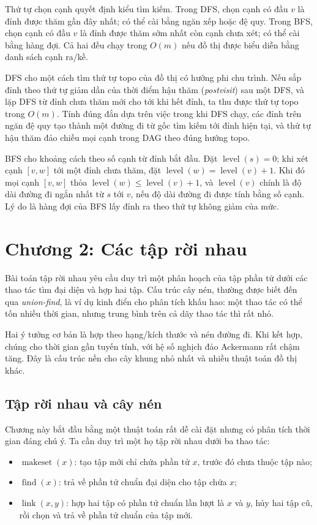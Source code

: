 \documentclass[11pt]{article}
\begin{document}
Thứ tự chọn cạnh quyết định kiểu tìm kiếm. Trong DFS, chọn cạnh có đầu \(v\)
là đỉnh được thăm gần đây nhất; có thể cài bằng ngăn xếp hoặc đệ quy. Trong
BFS, chọn cạnh có đầu \(v\) là đỉnh được thăm sớm nhất còn cạnh chưa xét; có thể
cài bằng hàng đợi. Cả hai đều chạy trong \(O(m)\) nếu đồ thị được biểu diễn bằng
danh sách cạnh ra/kề.

DFS cho một cách tìm thứ tự topo của đồ thị có hướng phi chu trình. Nếu sắp
đỉnh theo thứ tự giảm dần của thời điểm hậu thăm (\emph{postvisit}) sau một
DFS, và lặp DFS từ đỉnh chưa thăm mới cho tới khi hết đỉnh, ta thu được thứ tự
topo trong \(O(m)\). Tính đúng đắn dựa trên việc trong khi DFS chạy, các đỉnh
trên ngăn đệ quy tạo thành một đường đi từ gốc tìm kiếm tới đỉnh hiện tại, và
thứ tự hậu thăm đảo chiều mọi cạnh trong DAG theo đúng hướng topo.

BFS cho khoảng cách theo số cạnh từ đỉnh bắt đầu. Đặt
\(\operatorname{level}(s)=0\); khi xét cạnh \([v,w]\) tới một đỉnh chưa thăm,
đặt \(\operatorname{level}(w)=\operatorname{level}(v)+1\). Khi đó mọi cạnh
\([v,w]\) thỏa
\(\operatorname{level}(w)\le \operatorname{level}(v)+1\), và
\(\operatorname{level}(v)\) chính là độ dài đường đi ngắn nhất từ \(s\) tới
\(v\), nếu độ dài đường đi được tính bằng số cạnh. Lý do là hàng đợi của BFS lấy
đỉnh ra theo thứ tự không giảm của mức.

\section{Chương 2: Các tập rời nhau}

Bài toán tập rời nhau yêu cầu duy trì một phân hoạch của tập phần tử dưới các
thao tác tìm đại diện và hợp hai tập. Cấu trúc cây nén, thường được biết đến
qua \emph{union-find}, là ví dụ kinh điển cho phân tích khấu hao: một thao tác
có thể tốn nhiều thời gian, nhưng trung bình trên cả dãy thao tác thì rất nhỏ.

Hai ý tưởng cơ bản là hợp theo hạng/kích thước và nén đường đi. Khi kết hợp,
chúng cho thời gian gần tuyến tính, với hệ số nghịch đảo Ackermann rất chậm
tăng. Đây là cấu trúc nền cho cây khung nhỏ nhất và nhiều thuật toán đồ thị
khác.

\subsection*{Tập rời nhau và cây nén}

Chương này bắt đầu bằng một thuật toán rất dễ cài đặt nhưng có phân tích thời
gian đáng chú ý. Ta cần duy trì một họ tập rời nhau dưới ba thao tác:
\begin{itemize}
  \item \(\operatorname{makeset}(x)\): tạo tập mới chỉ chứa phần tử \(x\), trước
        đó chưa thuộc tập nào;
  \item \(\operatorname{find}(x)\): trả về phần tử chuẩn đại diện cho tập chứa
        \(x\);
  \item \(\operatorname{link}(x,y)\): hợp hai tập có phần tử chuẩn lần lượt là
        \(x\) và \(y\), hủy hai tập cũ, rồi chọn và trả về phần tử chuẩn của tập
        mới.
\end{itemize}
\end{document}
